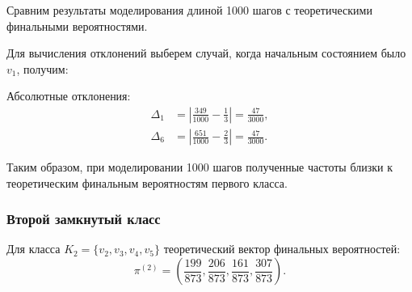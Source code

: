 \documentclass[a4paper, final]{article}
\begin{document}
\begin{table}
	\caption{}
\end{table}

Сравним результаты моделирования длиной 1000 шагов
с теоретическими финальными вероятностями.

Для вычисления отклонений выберем случай, когда начальным состоянием было $v_1$, получим:

Абсолютные отклонения:
\[
\begin{aligned}
	\Delta_1
	&=\left|\frac{349}{1000}-\frac13\right|
	=\frac{47}{3000},\\
	\Delta_6
	&=\left|\frac{651}{1000}-\frac23\right|
	=\frac{47}{3000}.
\end{aligned}
\] 

Таким образом, при моделировании 1000 шагов
полученные частоты близки к теоретическим
финальным вероятностям первого класса.

\subsubsection*{Второй замкнутый класс}

Для класса $K_2=\{v_2,v_3,v_4,v_5\}$
теоретический вектор финальных вероятностей:
\[
\pi^{(2)}=
\left(
\frac{199}{873},
\frac{206}{873},
\frac{161}{873},
\frac{307}{873}
\right).
\]
\end{document}
